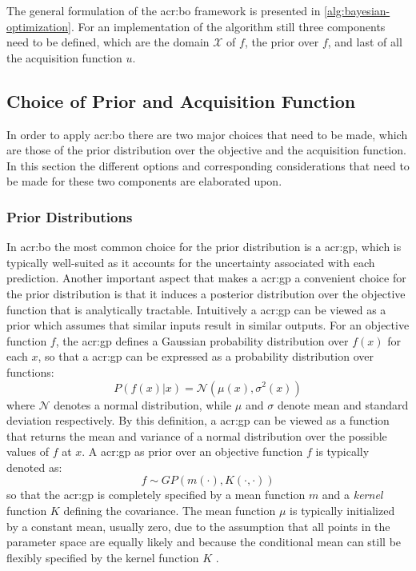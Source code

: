 The general formulation of the \acrshort{acr:bo} framework is presented in \autoref{alg:bayesian-optimization}.
For an implementation of the algorithm still three components need to be defined, which are the domain $\mathcal{X}$ of $f$, the prior over $f$, and last of all the acquisition function $u$.

\subsection{Choice of Prior and Acquisition Function}
\label{sec:bayesian-optimization-prior-acquisition}
In order to apply \acrlong{acr:bo} there are two major choices that need to be made, which are those of the prior distribution over the objective and the acquisition function. In this section the different options and corresponding considerations that need to be made for these two components are elaborated upon.

\subsubsection*{Prior Distributions}
\label{sec:bayesian-optimization-prior}
In \acrlong{acr:bo} the most common choice for the prior distribution is a \acrfull{acr:gp}, which is typically well-suited as it accounts for the uncertainty associated with each prediction.
Another important aspect that makes a \acrshort{acr:gp} a convenient choice for the prior distribution is that it induces a posterior distribution over the objective function that is analytically tractable.
Intuitively a \acrshort{acr:gp} can be viewed as a prior which assumes that similar inputs result in similar outputs.
For an objective function $f$, the \acrshort{acr:gp} defines a Gaussian probability distribution over $f(x)$ for each $x$, so that a \acrshort{acr:gp} can be expressed as a probability distribution over functions:
\begin{equation}
	P(f(x) \vert x) = \mathcal{N}(\mu(x), \sigma^2(x))
\end{equation}
where $\mathcal{N}$ denotes a normal distribution, while $\mu$ and $\sigma$ denote mean and standard deviation respectively.
By this definition, a \acrshort{acr:gp} can be viewed as a function that returns the mean and variance of a normal distribution over the possible values of $f$ at $x$. A \acrshort{acr:gp} as prior over an objective function $f$ is typically denoted as: 
\begin{equation}
\label{eq:gp}
f \sim GP(m(\cdot), K(\cdot, \cdot))
\end{equation}
so that the \acrshort{acr:gp} is completely specified by a mean function $m$ and a \textit{kernel} function $K$ defining the covariance.
The mean function $\mu$ is typically initialized by a constant mean, usually zero, due to the assumption that all points in the parameter space are equally likely and because the conditional mean can still be flexibly specified by the kernel function $K$ \cite{kawaguchi2015bayesian}.

